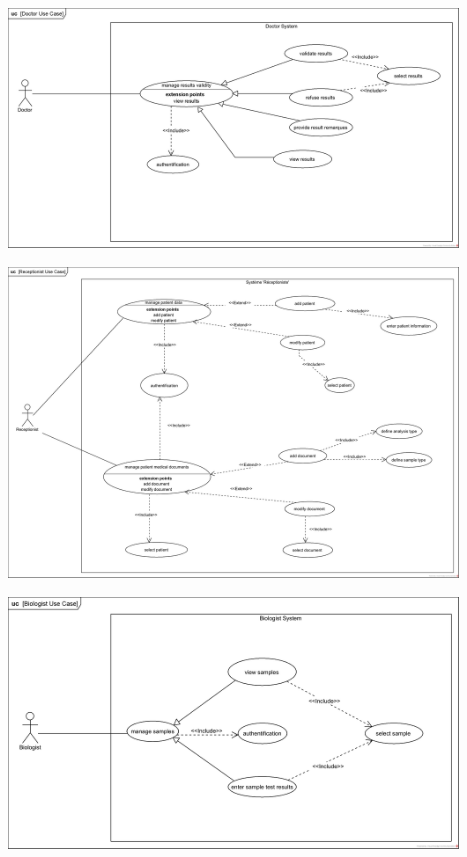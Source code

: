 \documentclass{article}
\begin{document}
\begin{center}
    \includegraphics[width=451px]{media/Use case diagrams/Doctor Use Case.png}
\end{center}



\begin{center}
    \includegraphics[width=451px]{media/Use case diagrams/Receptionist Use Case.png}
\end{center}


\begin{center}
    \includegraphics[width=451px]{media/Use case diagrams/Biologist Use Case.png}
\end{center}
\end{document}
